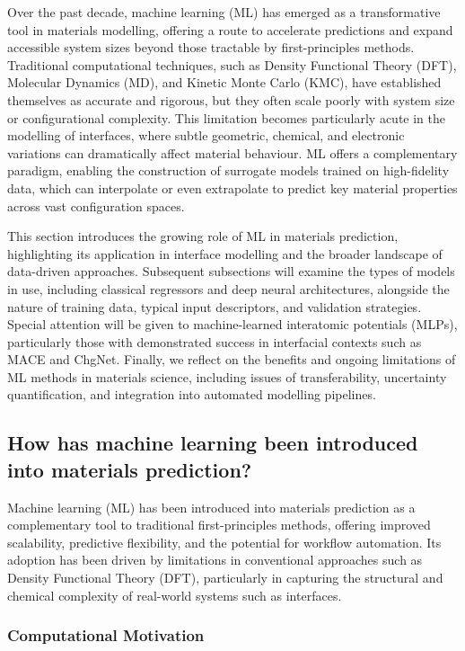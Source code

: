 Over the past decade, machine learning (ML) has emerged as a transformative tool in materials modelling, offering a
route to accelerate predictions and expand accessible system sizes beyond those tractable by first-principles methods.
Traditional computational techniques, such as Density Functional Theory (DFT), Molecular Dynamics (MD), and Kinetic
Monte Carlo (KMC), have established themselves as accurate and rigorous, but they often scale poorly with system size
or configurational complexity. This limitation becomes particularly acute in the modelling of interfaces, where subtle
geometric, chemical, and electronic variations can dramatically affect material behaviour. ML offers a complementary
paradigm, enabling the construction of surrogate models trained on high-fidelity data, which can interpolate or even
extrapolate to predict key material properties across vast configuration spaces.

This section introduces the growing role of ML in materials prediction, highlighting its application in interface
modelling and the broader landscape of data-driven approaches. Subsequent subsections will examine the types of models
in use, including classical regressors and deep neural architectures, alongside the nature of training data, typical
input descriptors, and validation strategies. Special attention will be given to machine-learned interatomic potentials
(MLPs), particularly those with demonstrated success in interfacial contexts such as MACE and ChgNet. Finally, we
reflect on the benefits and ongoing limitations of ML methods in materials science, including issues of
transferability, uncertainty quantification, and integration into automated modelling pipelines.

\subsection{How has machine learning been introduced into materials prediction?}

Machine learning (ML) has been introduced into materials prediction as a complementary tool to traditional
first-principles methods, offering improved scalability, predictive flexibility, and the potential for workflow
automation. Its adoption has been driven by limitations in conventional approaches such as Density Functional Theory
(DFT), particularly in capturing the structural and chemical complexity of real-world systems such as interfaces.

\subsubsection{Computational Motivation}


